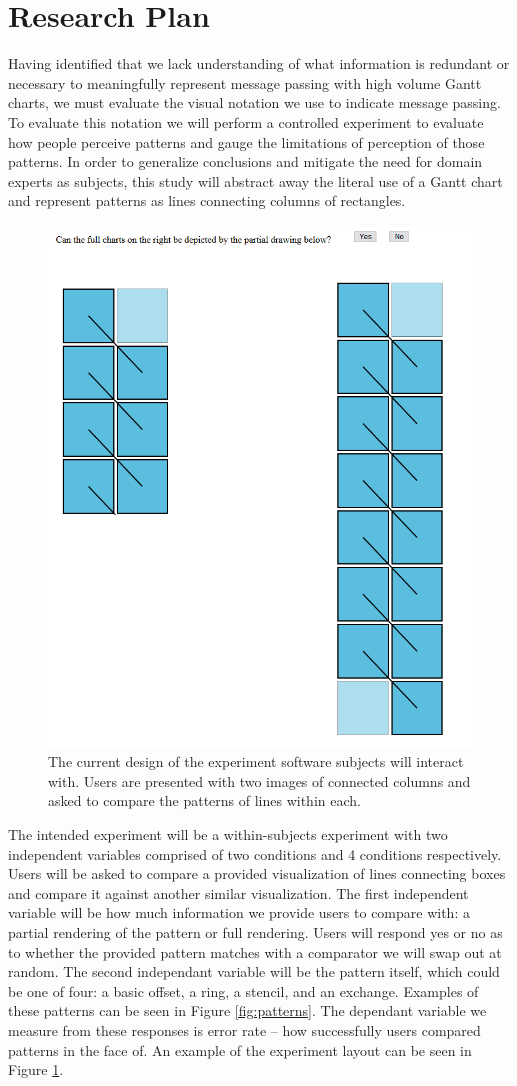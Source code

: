 \section{Research Plan} 
\label{sec:research}


Having identified that we lack understanding of what information is redundant or necessary to meaningfully represent message passing with high volume Gantt charts, we must evaluate the visual notation we use to indicate message passing. To evaluate this notation we will perform a controlled experiment to evaluate how people perceive patterns and gauge the limitations of perception of those patterns. In order to generalize conclusions and mitigate the need for domain experts as subjects, this study will abstract away the literal use of a Gantt chart and represent patterns as lines connecting columns of rectangles.

\begin{figure}[h]
    \centering
    \includegraphics[width=.4\textwidth]{figs/study.png}
    \caption{The current design of the experiment software subjects will interact with. Users are presented with two images of connected columns and asked to compare the patterns of lines within each.}
    \label{fig:study}
\end{figure}


The intended experiment will be a within-subjects experiment with two independent variables comprised of two conditions and 4 conditions respectively. Users will be asked to compare a provided visualization of lines connecting boxes and compare it against another similar visualization. The first independent variable will be how much information we provide users to compare with: a partial rendering of the pattern or full rendering. Users will respond yes or no as to whether the provided pattern matches with a comparator we will swap out at random. The second independant variable will be the pattern itself, which could be one of four: a basic offset, a ring, a stencil, and an exchange. Examples of these patterns can be seen in Figure \ref{fig:patterns}. The dependant variable we measure from these responses is error rate -- how successfully users compared patterns in the face of. An example of the experiment layout can be seen in Figure \ref{fig:study}.


